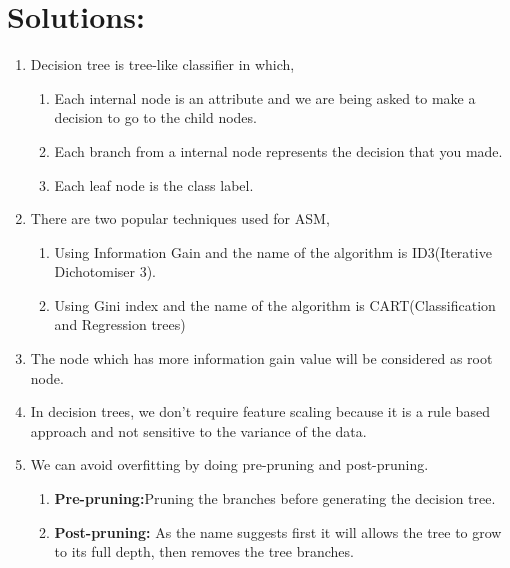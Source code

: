 \documentclass[journal,12pt,onecolumn]{IEEEtran}
\theoremstyle{remark}
\numberwithin{equation}{section}
\begin{document}
       \section{Solutions:}
       \begin{enumerate}
         \item Decision tree is tree-like classifier in which,
          \begin{enumerate}
	        \item Each internal node is an attribute and we are being asked to make a decision to go to the child nodes.
		\item Each branch from a internal node represents the decision that you made.
		\item Each leaf node is the class label.
	      \end{enumerate}
	 \item There are two popular techniques used for ASM,
		 \begin{enumerate}
	           \item Using Information Gain and the name of the algorithm is ID3(Iterative Dichotomiser 3).
		   \item Using Gini index and the name of the algorithm is CART(Classification and Regression trees)
		 \end{enumerate}
	 \item The node which has more information gain value will be considered as root node.
	 \item In decision trees, we don't require feature scaling because it is a rule based approach and not sensitive to the variance of the data.
         \item We can avoid overfitting by doing pre-pruning and post-pruning.
                \begin{enumerate}
		\item \textbf{Pre-pruning:}Pruning the branches before generating the decision tree.
		\item \textbf{Post-pruning:} As the name suggests first it will allows the tree to grow to its full depth, then removes the tree branches.
		\end{enumerate}
	 \end{enumerate}
        
\end{document}
